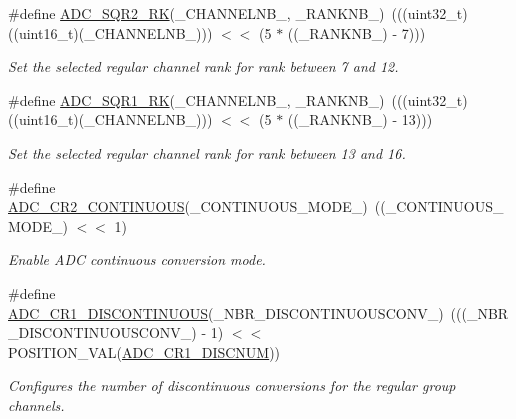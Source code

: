 \begin{DoxyCompactItemize}
\#define \hyperlink{group___a_d_c___private___macros_gad07a38a5b6d28f23ecbe027222f59bd0}{A\+D\+C\+\_\+\+S\+Q\+R2\+\_\+\+RK}(\+\_\+\+C\+H\+A\+N\+N\+E\+L\+N\+B\+\_\+,  \+\_\+\+R\+A\+N\+K\+N\+B\+\_\+)~(((uint32\+\_\+t)((uint16\+\_\+t)(\+\_\+\+C\+H\+A\+N\+N\+E\+L\+N\+B\+\_\+))) $<$$<$ (5 $\ast$ ((\+\_\+\+R\+A\+N\+K\+N\+B\+\_\+) -\/ 7)))
\begin{DoxyCompactList}\small\item\em Set the selected regular channel rank for rank between 7 and 12. \end{DoxyCompactList}\item 
\#define \hyperlink{group___a_d_c___private___macros_ga89869cd79b14d222a9b235bd150fc512}{A\+D\+C\+\_\+\+S\+Q\+R1\+\_\+\+RK}(\+\_\+\+C\+H\+A\+N\+N\+E\+L\+N\+B\+\_\+,  \+\_\+\+R\+A\+N\+K\+N\+B\+\_\+)~(((uint32\+\_\+t)((uint16\+\_\+t)(\+\_\+\+C\+H\+A\+N\+N\+E\+L\+N\+B\+\_\+))) $<$$<$ (5 $\ast$ ((\+\_\+\+R\+A\+N\+K\+N\+B\+\_\+) -\/ 13)))
\begin{DoxyCompactList}\small\item\em Set the selected regular channel rank for rank between 13 and 16. \end{DoxyCompactList}\item 
\#define \hyperlink{group___a_d_c___private___macros_gae92924f248b2fd7693ce648275a8087c}{A\+D\+C\+\_\+\+C\+R2\+\_\+\+C\+O\+N\+T\+I\+N\+U\+O\+US}(\+\_\+\+C\+O\+N\+T\+I\+N\+U\+O\+U\+S\+\_\+\+M\+O\+D\+E\+\_\+)~((\+\_\+\+C\+O\+N\+T\+I\+N\+U\+O\+U\+S\+\_\+\+M\+O\+D\+E\+\_\+) $<$$<$ 1)
\begin{DoxyCompactList}\small\item\em Enable A\+DC continuous conversion mode. \end{DoxyCompactList}\item 
\#define \hyperlink{group___a_d_c___private___macros_ga5b8b6fe1d24684616ccf43b8e5e0ef23}{A\+D\+C\+\_\+\+C\+R1\+\_\+\+D\+I\+S\+C\+O\+N\+T\+I\+N\+U\+O\+US}(\+\_\+\+N\+B\+R\+\_\+\+D\+I\+S\+C\+O\+N\+T\+I\+N\+U\+O\+U\+S\+C\+O\+N\+V\+\_\+)~(((\+\_\+\+N\+B\+R\+\_\+\+D\+I\+S\+C\+O\+N\+T\+I\+N\+U\+O\+U\+S\+C\+O\+N\+V\+\_\+) -\/ 1) $<$$<$ P\+O\+S\+I\+T\+I\+O\+N\+\_\+\+V\+AL(\hyperlink{group___peripheral___registers___bits___definition_gaeaa416a291023449ae82e7ef39844075}{A\+D\+C\+\_\+\+C\+R1\+\_\+\+D\+I\+S\+C\+N\+UM}))
\begin{DoxyCompactList}\small\item\em Configures the number of discontinuous conversions for the regular group channels. \end{DoxyCompactList}\item 

\end{DoxyCompactItemize}
